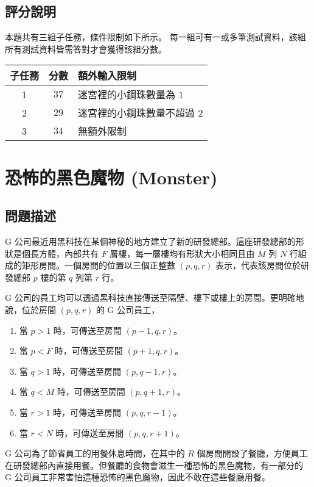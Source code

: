 \subsection{評分說明}

本題共有三組子任務，條件限制如下所示。
每一組可有一或多筆測試資料，該組所有測試資料皆需答對才會獲得該組分數。

\begin{longtable}[]{@{}ccl@{}}
\toprule
子任務 & 分數 & 額外輸入限制 \\
\midrule
\endhead
1 & \(37\) & 迷宮裡的小鋼珠數量為 \(1\) \\
2 & \(29\) & 迷宮裡的小鋼珠數量不超過 \(2\) \\
3 & \(34\) & 無額外限制 \\
\bottomrule
\end{longtable}

\section{恐怖的黑色魔物 (Monster)}

\subsection{問題描述}

G
公司最近用黑科技在某個神秘的地方建立了新的研發總部。這座研發總部的形狀是個長方體，內部共有
\(F\) 層樓，每一層樓均有形狀大小相同且由 \(M\) 列 \(N\)
行組成的矩形房間。一個房間的位置以三個正整數 \((p, q, r)\)
表示，代表該房間位於研發總部 \(p\) 樓的第 \(q\) 列第 \(r\) 行。

G
公司的員工均可以透過黑科技直接傳送至隔壁、樓下或樓上的房間。更明確地說，位於房間
\((p, q, r)\) 的 G 公司員工，

\begin{enumerate}
\def\labelenumi{\arabic{enumi}.}
\tightlist
\item
  當 \(p > 1\) 時，可傳送至房間 \((p-1, q, r)\)。
\item
  當 \(p < F\) 時，可傳送至房間 \((p+1, q, r)\)。
\item
  當 \(q > 1\) 時，可傳送至房間 \((p, q-1, r)\)。
\item
  當 \(q < M\) 時，可傳送至房間 \((p, q+1, r)\)。
\item
  當 \(r > 1\) 時，可傳送至房間 \((p, q, r-1)\)。
\item
  當 \(r < N\) 時，可傳送至房間 \((p, q, r+1)\)。
\end{enumerate}

G 公司為了節省員工的用餐休息時間，在其中的 \(R\)
個房間開設了餐廳，方便員工在研發總部內直接用餐。但餐廳的食物會滋生一種恐怖的黑色魔物，有一部分的
G 公司員工非常害怕這種恐怖的黑色魔物，因此不敢在這些餐廳用餐。

